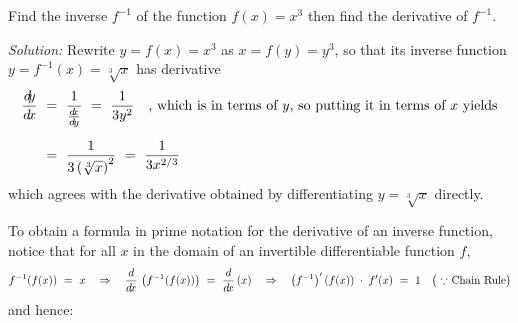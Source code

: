 \begin{exmp}\label{exmp:invderivalt}
 Find the inverse $f^{-1}$ of the function $f(x) = x^3$ then find the derivative
 of $f^{-1}$.\vspace{1mm}
 \par\noindent\emph{Solution:} Rewrite $y = f(x) = x^3$ as
 $x = f(y) = y^3$, so that its inverse function $y = f^{-1}(x)= \sqrt[3]{x} $
 has derivative
 \begin{align*}
  \frac{d\negmedspace y}{d\!x} ~&=~ \frac{1}{\frac{d\negmedspace x}{d\!y}} ~=~ \frac{1}{3y^2} \quad\text{, which is in terms of $y$,
             so putting it in terms of $x$ yields}\\[6pt]
         &=~ \frac{1}{3 \left(\sqrt[3]{x}\right)^2} ~=~
		     \frac{1}{3 x^{2/3}}
 \end{align*}
 which agrees with the derivative obtained by differentiating $y = \sqrt[3]{x}$
 directly.
\end{exmp}
\divider
\newpage
To obtain a formula in prime notation for the derivative of an inverse function,
notice that for all $x$ in the domain of an invertible differentiable function
$f$,
\[
 f^{-1}(f(x)) ~=~ x \quad\Rightarrow\quad
 \frac{d}{d\!x}\,\left(f^{-1}(f(x))\right) ~=~ \frac{d}{d\!x}\,(x) \quad\Rightarrow\quad
 \left(f^{-1}\right)'(f(x)) \;\cdot\; f'(x) ~=~ 1
 \quad\big(\text{ $\because$ Chain Rule}\big)
\]
and hence:

